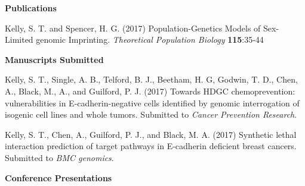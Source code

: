 \textbf{Publications}

\begin{small} \begin{flushleft} Kelly, S. T. and Spencer, H. G. (2017) Population-Genetics Models of Sex-Limited \Gls{genomic} Imprinting. \textit{Theoretical Population Biology} \textbf{115}:35-44  \end{flushleft} \end{small}

\textbf{Manuscripts Submitted}

\begin{small}
Kelly, S. T., Single, A. B., Telford, B. J., Beetham, H. G, Godwin, T. D., Chen, A., Black, M., A., and Guilford, P. J. (2017) Towards HDGC chemoprevention: vulnerabilities in \gls{E-cadherin}-negative cells identified by \gls{genomic} interrogation of isogenic cell lines and whole tumors.  Submitted to \textit{Cancer Prevention Research}.

Kelly, S. T., Chen, A., Guilford, P. J., and Black, M. A. (2017) Synthetic lethal interaction prediction of target pathways in \gls{E-cadherin} deficient breast cancers. Submitted to \textit{BMC \Glspl{genomic}}.
\end{small}
\fi

\iffalse
\textbf{Community Blog Posts}

Black, M. A., Kelly, S. T., and Cadzow, M.
Posted on the \textit{Software Carpentry} website 2016 July 4\textsuperscript{th}: 
``Software Carpentry workshop at the University of Otago, New Zealand''
\url{https://software-carpentry.org/blog/2016/07/otago-workshop.html}

Kelly, S. T., Black, M., A., Bae, S., Hayek, W., and Pawlik, A. Posted on the \textit{Software Carpentry} website 2016 September 28\textsuperscript{th}:  ``Software Carpentry Workshop Attendance: a New Zealand Perspective``
\url{https://software-carpentry.org/blog/2016/09/attendance-nz.html}
\fi

\iffalse
\textbf{Conference Presentations}

